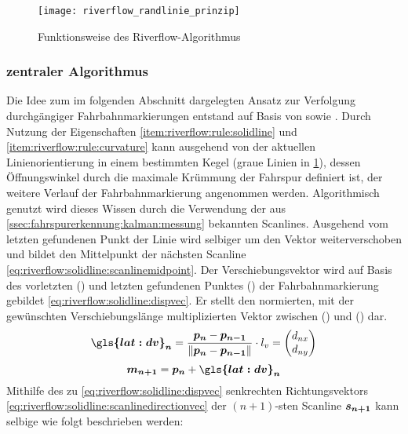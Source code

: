 \begin{figure}[H]
  \centering
  \texttt{[image: riverflow\_randlinie\_prinzip]}
  \caption{Funktionsweise des Riverflow-Algorithmus}
  \label{fig:riverflow:randlinie:prinzip}
\end{figure}

\subsubsection{zentraler Algorithmus}
Die Idee zum im folgenden Abschnitt dargelegten Ansatz zur Verfolgung durchgängiger Fahrbahnmarkierungen entstand auf Basis von \autocite{drauschkeEchtzeitfaehigeStartpunktalgorithmenFuer2016} sowie \autocite{limRiverFlowLane2012}.
Durch Nutzung der Eigenschaften \ref{item:riverflow:rule:solidline} und  \ref{item:riverflow:rule:curvature} kann ausgehend von der aktuellen Linienorientierung in einem bestimmten Kegel (graue Linien in \ref{fig:riverflow:randlinie:prinzip}), dessen Öffnungswinkel durch die maximale Krümmung der Fahrspur definiert ist, der weitere Verlauf der Fahrbahnmarkierung angenommen werden.
Algorithmisch genutzt wird dieses Wissen durch die Verwendung der aus \ref{ssec:fahrspurerkennung:kalman:messung} bekannten Scanlines.
Ausgehend vom letzten gefundenen Punkt der Linie  wird selbiger um den Vektor  weiterverschoben und bildet den Mittelpunkt   der nächsten Scanline \eqref{eq:riverflow:solidline:scanlinemidpoint}. Der Verschiebungsvektor  wird auf Basis des vorletzten () und letzten gefundenen Punktes () der Fahrbahnmarkierung gebildet \eqref{eq:riverflow:solidline:dispvec}. Er stellt den normierten, mit der gewünschten Verschiebungslänge  multiplizierten Vektor zwischen () und () dar.
\begin{equation}
\label{eq:riverflow:solidline:dispvec}
\vct{\gls{lat:dv}_n} =  \frac{\pnt{p_{n}} - \pnt{p_{n-1}}}{\nrm{\pnt{p_{n}} - \pnt{p_{n-1}}}} \cdot \scl{l_v}
= 
\begin{pmatrix}
\scl{d_{nx}} \\
\scl{d_{ny}}
\end{pmatrix}
\end{equation}
\begin{equation}
\label{eq:riverflow:solidline:scanlinemidpoint}
\pnt{m_{n+1}} =  \pnt{p_n} + \vct{\gls{lat:dv}_n}
\end{equation}
Mithilfe des zu  \eqref{eq:riverflow:solidline:dispvec} senkrechten Richtungsvektors  \eqref{eq:riverflow:solidline:scanlinedirectionvec} der \begin{math} (n+1)\end{math}-sten  Scanline \begin{math} \boldsymbol{s_{n+1}} \end{math} kann selbige wie folgt beschrieben werden:
